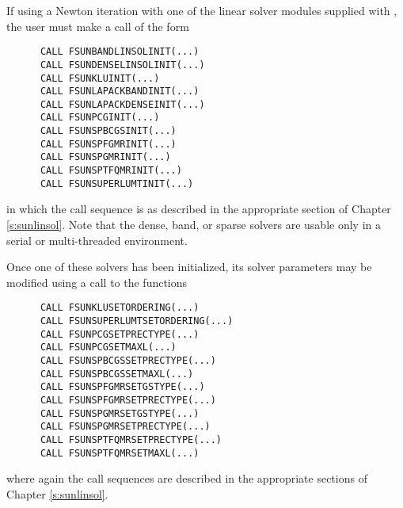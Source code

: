 \begin{Steps}
  If using a Newton iteration with one of the {\sunlinsol} linear
  solver modules supplied with {\sundials}, the user must make a call
  of the form
\begin{verbatim}
      CALL FSUNBANDLINSOLINIT(...)
      CALL FSUNDENSELINSOLINIT(...)
      CALL FSUNKLUINIT(...)
      CALL FSUNLAPACKBANDINIT(...)
      CALL FSUNLAPACKDENSEINIT(...)
      CALL FSUNPCGINIT(...)
      CALL FSUNSPBCGSINIT(...)
      CALL FSUNSPFGMRINIT(...)
      CALL FSUNSPGMRINIT(...)
      CALL FSUNSPTFQMRINIT(...)
      CALL FSUNSUPERLUMTINIT(...)
\end{verbatim}
in which the call sequence is as described in the appropriate
section of Chapter \ref{s:sunlinsol}.  Note that the dense, band, or
sparse solvers are usable only in a serial or multi-threaded
environment.

Once one of these solvers has been initialized, its solver parameters may be
modified using a call to the functions
\begin{verbatim}
      CALL FSUNKLUSETORDERING(...)
      CALL FSUNSUPERLUMTSETORDERING(...)
      CALL FSUNPCGSETPRECTYPE(...)
      CALL FSUNPCGSETMAXL(...)
      CALL FSUNSPBCGSSETPRECTYPE(...)
      CALL FSUNSPBCGSSETMAXL(...)
      CALL FSUNSPFGMRSETGSTYPE(...)
      CALL FSUNSPFGMRSETPRECTYPE(...)
      CALL FSUNSPGMRSETGSTYPE(...)
      CALL FSUNSPGMRSETPRECTYPE(...)
      CALL FSUNSPTFQMRSETPRECTYPE(...)
      CALL FSUNSPTFQMRSETMAXL(...)
\end{verbatim}
where again the call sequences are described in the appropriate
sections of Chapter \ref{s:sunlinsol}.




\end{Steps}
